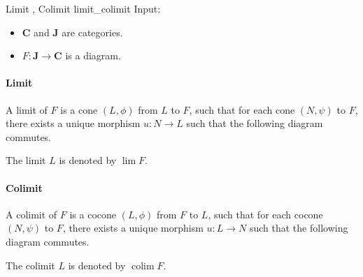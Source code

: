 \documentclass{article}
\begin{document}
\begin{definition}{Limit , Colimit }{limit_colimit}
    Input:
    \begin{itemize}
        \item $\mathbf{C}$ and $\mathbf{J}$ are categories.
        \item $F:\mathbf{J}\rightarrow\mathbf{C}$ is a diagram.
    \end{itemize}
    \paragraph*{Limit}
    A limit of $F$ is a cone $(L,\phi)$ from $L$ to $F$, such that for each cone $(N,\psi)$ to $F$, there exists a unique morphism $u: N\rightarrow L$ such that the following diagram commutes.
    \begin{center}
    \end{center}
    The limit $L$ is denoted by $\lim F$.
    \tcblower
    \paragraph*{Colimit}
    A colimit of $F$ is a cocone $(L,\phi)$ from $F$ to $L$, such that for each cocone $(N,\psi)$ to $F$, there exists a unique morphism $u: L\rightarrow N$ such that the following diagram commutes.
    \begin{center}
    \end{center}
    The colimit $L$ is denoted by $\operatorname{colim} F$.
\end{definition}
\end{document}
